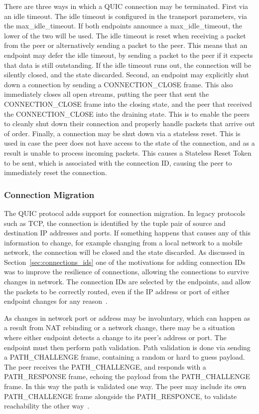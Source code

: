 \documentclass[english, 12pt, a4paper, elec, utf8, a-2b, online]{aaltothesis}
\begin{document}
There are three ways in which a QUIC connection may be terminated. First via an
idle timeout. The idle timeout is configured in the transport parameters, via the
max\_idle\_timeout. If both endpoints announce a max\_idle\_timeout, the lower of
the two will be used. The idle timeout is reset when receiving a packet from the 
peer or alternatively sending a packet to the peer. This means that an endpoint
may defer the idle timeout, by sending a packet to the peer if it expects that
data is still outstanding. If the idle timeout runs out, the connection will be
silently closed, and the state discarded. Second, an endpoint may explicitly
shut down a connection by sending a CONNECTION\_CLOSE frame. This also immediately
closes all open streams, putting the peer that sent the CONNECTION\_CLOSE frame into
the closing state, and the peer that received the CONNECTION\_CLOSE into the draining
state. This is to enable the peers to cleanly shut down their connection and
properly handle packets that arrive out of order. Finally, a connection may be
shut down via a stateless reset. This is used in case the peer does not have
access to the state of the connection, and as a result is unable to process incoming
packets. This causes a Stateless Reset Token to be sent, which is associated with the
connection ID, causing the peer to immediately reset the connection.

\subsubsection{Connection Migration}

The QUIC protocol adds support for connection migration. In legacy protocols such
as TCP, the connection is identified by the tuple pair of source and destination
IP addresses and ports. If something happens that causes any of this information to
change, for example changing from a local network to a mobile network, the connection will
be closed and the state discarded. As discussed in Section~\ref{sec:connections_ids}
one of the motivations for adding connection IDs was to improve the resilience of
connections, allowing the connections to survive changes in network. The connection IDs
are selected by the endpoints, and allow the packets to be correctly routed,
even if the IP address or port of either endpoint changes for any reason~\cite{rfc9000}.

As changes in network port or address may be involuntary, which can happen as a
result from NAT rebinding or a network change, there may be a situation where
either endpoint detects a change to its peer's address or port. The endpoint must then perform
path validation. Path validation is done via sending a PATH\_CHALLENGE frame, containing
a random or hard to guess payload. The peer receives the PATH\_CHALLENGE, and responds
with a PATH\_RESPONSE frame, echoing the payload from the PATH\_CHALLENGE frame.
In this way the path is validated one way. The peer may include its own PATH\_CHALLENGE
frame alongside the PATH\_RESPONCE, to validate reachability the other way~\cite{rfc9000}.
\end{document}

